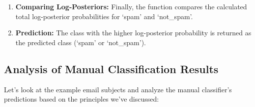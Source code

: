 \documentclass[12pt,letterpaper]{article}
\begin{document}
\begin{enumerate}
    \item \textbf{Comparing Log-Posteriors:} Finally, the function compares the calculated total log-posterior probabilities for `spam' and `not\_spam'.
    
    \item \textbf{Prediction:} The class with the higher log-posterior probability is returned as the predicted class (`spam' or `not\_spam').
\end{enumerate}

\subsection{Analysis of Manual Classification Results}

Let's look at the example email subjects and analyze the manual classifier's predictions based on the principles we've discussed:
\end{document}
